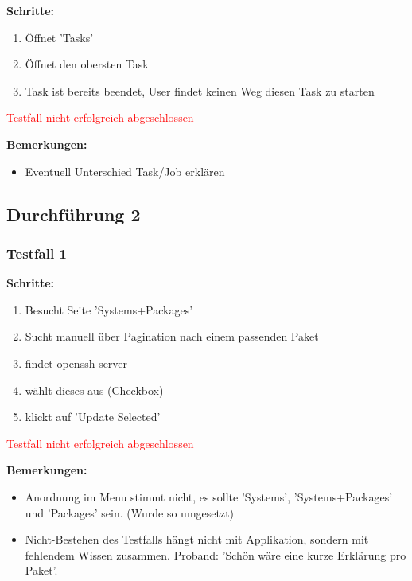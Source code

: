 \textbf{Schritte:}

\begin{enumerate}
    \item Öffnet 'Tasks'
    \item Öffnet den obersten Task
    \item Task ist bereits beendet, User findet keinen Weg diesen Task zu starten
\end{enumerate}

\textcolor{Red}{Testfall nicht erfolgreich abgeschlossen}

\bigskip
\textbf{Bemerkungen:}

\begin{itemize}[noitemsep,nolistsep]
    \item Eventuell Unterschied Task/Job erklären
\end{itemize}



\subsection*{Durchführung 2}

\subsubsection*{Testfall 1}

\textbf{Schritte:}

\begin{enumerate}
    \item Besucht Seite 'Systems+Packages'
    \item Sucht manuell über Pagination nach einem passenden Paket
    \item findet openssh-server
    \item wählt dieses aus (Checkbox)
    \item klickt auf 'Update Selected'
\end{enumerate}

\textcolor{Red}{Testfall nicht erfolgreich abgeschlossen}

\bigskip
\textbf{Bemerkungen:}

\begin{itemize}[noitemsep,nolistsep]
    \item Anordnung im Menu stimmt nicht, es sollte 'Systems', 'Systems+Packages' und 'Packages' sein. (Wurde so umgesetzt)
    \item Nicht-Bestehen des Testfalls hängt nicht mit Applikation, sondern mit fehlendem Wissen zusammen. Proband: 'Schön wäre eine kurze Erklärung pro Paket'.
\end{itemize}


